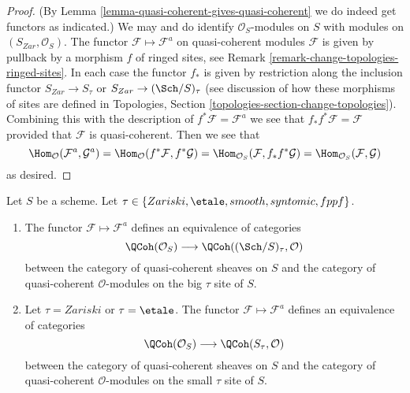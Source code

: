 \begin{proof}
(By Lemma \ref{lemma-quasi-coherent-gives-quasi-coherent} we do
indeed get functors as indicated.)
We may and do identify $\mathcal{O}_S$-modules on $S$ with
modules on $(S_{Zar}, \mathcal{O}_S)$.
The functor $\mathcal{F} \mapsto \mathcal{F}^a$ on quasi-coherent modules
$\mathcal{F}$ is given by pullback by a morphism $f$
of ringed sites, see Remark \ref{remark-change-topologies-ringed-sites}.
In each case the functor $f_*$ is given by restriction
along the inclusion functor $S_{Zar} \to S_\tau$ or
$S_{Zar} \to (\Sch/S)_\tau$ (see discussion of how
these morphisms of sites are defined in Topologies, Section
\ref{topologies-section-change-topologies}).
Combining this with the description of $f^*\mathcal{F} = \mathcal{F}^a$
we see that $f_*f^*\mathcal{F} = \mathcal{F}$ provided that
$\mathcal{F}$ is quasi-coherent. Then we see that
$$
\Hom_\mathcal{O}(\mathcal{F}^a, \mathcal{G}^a) =
\Hom_\mathcal{O}(f^*\mathcal{F}, f^*\mathcal{G}) =
\Hom_{\mathcal{O}_S}(\mathcal{F}, f_*f^*\mathcal{G}) =
\Hom_{\mathcal{O}_S}(\mathcal{F}, \mathcal{G})
$$
as desired.
\end{proof}

\begin{proposition}
\label{proposition-equivalence-quasi-coherent}
Let $S$ be a scheme.
Let $\tau \in \{Zariski, \linebreak[0] \etale, \linebreak[0]
smooth, \linebreak[0] syntomic, \linebreak[0] fppf\}$.
\begin{enumerate}
\item The functor $\mathcal{F} \mapsto \mathcal{F}^a$
defines an equivalence of categories
$$
\QCoh(\mathcal{O}_S)
\longrightarrow
\QCoh((\Sch/S)_\tau, \mathcal{O})
$$
between the category of quasi-coherent sheaves on $S$ and the category
of quasi-coherent $\mathcal{O}$-modules on the big $\tau$ site of $S$.
\item Let $\tau = Zariski$ or $\tau = \etale$.
The functor $\mathcal{F} \mapsto \mathcal{F}^a$
defines an equivalence of categories
$$
\QCoh(\mathcal{O}_S)
\longrightarrow
\QCoh(S_\tau, \mathcal{O})
$$
between the category of quasi-coherent sheaves on $S$ and the category
of quasi-coherent $\mathcal{O}$-modules on the small $\tau$ site of $S$.
\end{enumerate}
\end{proposition}

